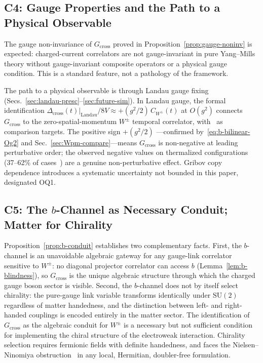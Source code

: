 \documentclass[12pt]{article}
\numberwithin{equation}{section}
\theoremstyle{plain}
\theoremstyle{definition}
\theoremstyle{remark}
\newcommand{\su}{\mathrm{SU}}              %
\newcommand{\Gcross}{G_{\mathrm{cross}}}   %
\newcommand{\Dcross}{\Delta_{\mathrm{cross}}}  %
\begin{document}
	\subsection{C4: Gauge Properties and the Path to a Physical
		Observable}
	\label{sec:disc-gauge}
	
	The gauge non-invariance of $\Gcross$ proved in
	Proposition~\ref{prop:gauge-noninv} is expected: charged-current
	correlators are not gauge-invariant in pure Yang--Mills theory
	without gauge-invariant composite operators or a physical gauge
	condition.  This is a standard feature, not a pathology of the
	framework.
	
	The path to a physical observable is through Landau gauge fixing
	(Secs.~\ref{sec:landau-presc}--\ref{sec:future-sim}).  In Landau
	gauge, the formal identification
	$\Dcross(t)|_{\mathrm{Landau}}/8V \approx +(g^2/2)\,C_{W^{\pm}}(t)$
	at $O(g^{2})$ connects $\Gcross$ to the zero-spatial-momentum
	$W^{\pm}$ temporal correlator, with~\cite{CucchieriMendes2008,%
		Bogolubsky} as comparison targets.  The positive sign $+(g^{2}/2)$
	---confirmed by~\eqref{eq:b-bilinear-Og2} and
	Sec.~\ref{sec:Wpm-compare}---means $\Gcross$ is non-negative at
	leading perturbative order; the observed negative values on
	thermalized configurations (37--62\% of cases~\cite{FirestoneP4}) are
	a genuine non-perturbative effect.  Gribov copy dependence introduces
	a systematic uncertainty not bounded in this paper, designated OQ1.
	
	\subsection{C5: The \texorpdfstring{$b$}{b}-Channel as Necessary
		Conduit; Matter for Chirality}
	\label{sec:disc-chirality}
	
	Proposition~\ref{prop:b-conduit} establishes two complementary facts.
	First, the $b$-channel is an unavoidable algebraic gateway for any
	gauge-link correlator sensitive to $W^{\pm}$: no diagonal projector
	correlator can access $b$ (Lemma~\ref{lem:b-blindness}), so $\Gcross$
	is the unique algebraic structure through which the charged gauge
	boson sector is visible.  Second, the $b$-channel does not by itself
	select chirality: the pure-gauge link variable transforms identically
	under $\su(2)$ regardless of matter handedness, and the distinction
	between left- and right-handed couplings is encoded entirely in the
	matter sector.  The identification of $\Gcross$ as the algebraic
	conduit for $W^{\pm}$ is a necessary but not sufficient condition for
	implementing the chiral structure of the electroweak interaction.
	Chirality selection requires fermionic fields with definite
	handedness, and faces the Nielsen--Ninomiya
	obstruction~\cite{NielsenNinomiya1981a,NielsenNinomiya1981b} in any
	local, Hermitian, doubler-free formulation.
	
\end{document}
